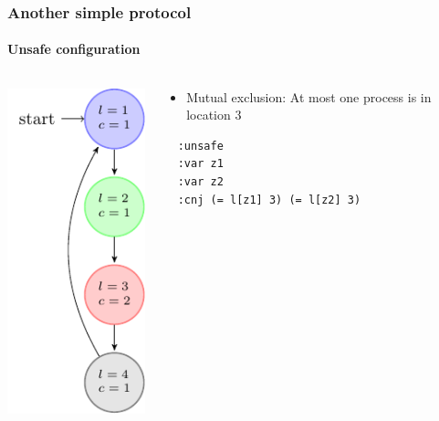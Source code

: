 \begin{frame}[fragile]
  \frametitle{Another simple protocol}
  \framesubtitle{Unsafe configuration}

\begin{columns}
\begin{column}{0.3\textwidth}
\centering
\includegraphics{pictures/demo-prot2-fig}
\end{column}
\begin{column}{0.7\textwidth}
  
  \begin{itemize}
    \item Mutual exclusion: At most one process is in location $3$
  \end{itemize}

\pause


\pause
  
  \begin{verbatim}
  :unsafe
  :var z1
  :var z2
  :cnj (= l[z1] 3) (= l[z2] 3)
  \end{verbatim}
\end{column}

\end{columns}  

\end{frame}





